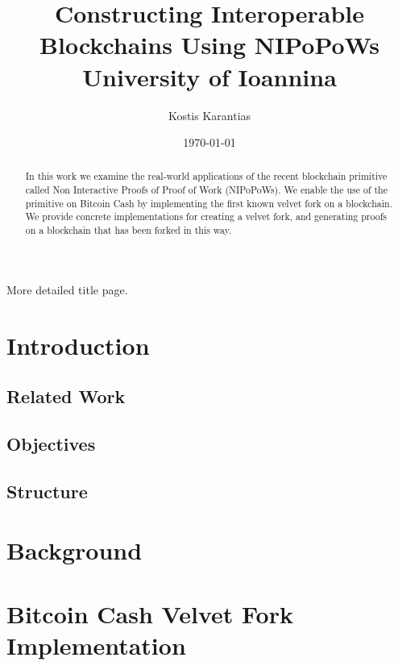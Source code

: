 \documentclass[12pt]{report}
\begin{document}
\title{
  {Constructing Interoperable Blockchains Using NIPoPoWs} \\
  {\large University of Ioannina} \\
}
\author{Kostis Karantias}
\date{\today}

\maketitle

\newpage
\null
\newpage

More detailed title page.

\newpage
\null
\newpage

\begin{abstract}
  In this work we examine the real-world applications of the recent blockchain
  primitive called Non Interactive Proofs of Proof of Work (NIPoPoWs). We
  enable the use of the primitive on Bitcoin Cash by implementing the first
  known velvet fork on a blockchain. We provide concrete implementations for
  creating a velvet fork, and generating proofs on a blockchain that has been
  forked in this way.
\end{abstract}

\newpage

\tableofcontents

\newpage

\thispagestyle{plain}

\chapter{Introduction}

\section{Related Work}
\section{Objectives}
\section{Structure}

\chapter{Background}



\chapter{Bitcoin Cash Velvet Fork Implementation}
\end{document}
